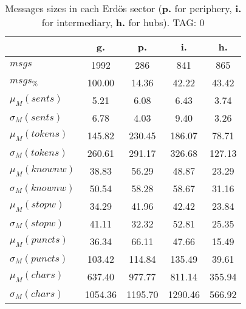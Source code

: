 \begin{table}[h!]
\begin{center}
\begin{tabular}{| l || c | c | c | c |}\hline
 & {\bf g.} & {\bf p.} & {\bf i.} & {\bf h.} \\\hline\hline
$msgs$ & 1992  & 286  & 841  & 865 \\
$msgs_{\%}$ & 100.00  & 14.36  & 42.22  & 43.42 \\\hline
$\mu_M(sents)$ & 5.21  & 6.08  & 6.43  & 3.74 \\
$\sigma_M(sents)$ & 6.78  & 4.03  & 9.40  & 3.26 \\\hline
$\mu_M(tokens)$ & 145.82  & 230.45  & 186.07  & 78.71 \\
$\sigma_M(tokens)$ & 260.61  & 291.17  & 326.68  & 127.13 \\\hline
$\mu_M(knownw)$ & 38.83  & 56.29  & 48.87  & 23.29 \\
$\sigma_M(knownw)$ & 50.54  & 58.28  & 58.67  & 31.16 \\\hline
$\mu_M(stopw)$ & 34.29  & 41.96  & 42.42  & 23.84 \\
$\sigma_M(stopw)$ & 41.11  & 32.32  & 52.81  & 25.35 \\\hline
$\mu_M(puncts)$ & 36.34  & 66.11  & 47.66  & 15.49 \\
$\sigma_M(puncts)$ & 103.42  & 114.84  & 135.49  & 39.61 \\\hline
$\mu_M(chars)$ & 637.40  & 977.77  & 811.14  & 355.94 \\
$\sigma_M(chars)$ & 1054.36  & 1195.70  & 1290.46  & 566.92 \\\hline
\end{tabular}
\caption{Messages sizes in each Erd\"os sector ({{\bf p.}} for periphery, {{\bf i.}} for intermediary, {{\bf h.}} for hubs). TAG: 0}
\end{center}
\end{table}